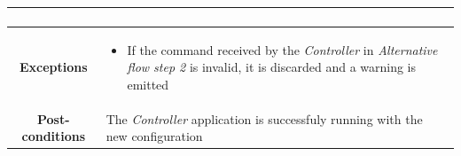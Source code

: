 \documentclass[12pt,a4paper,table]{article}
\begin{document}
\begin{longtable}{ |c|p{11.8cm}| }
{\begin{enumerate}
                    \end{enumerate}
                }\\ \hline
                \cellcolor[gray]{0.9} \textbf{Exceptions} & 
                    \begin{itemize}
                        \item If the command received by the \textit{Controller} in \textit{Alternative flow step 2} is invalid, it is discarded and a warning is emitted
                    \end{itemize}\\ \hline
                \cellcolor[gray]{0.9} \textbf{Post-conditions} & The \textit{Controller} application is successfuly running with the new configuration\\ \hline
            \end{longtable}
\end{document}
